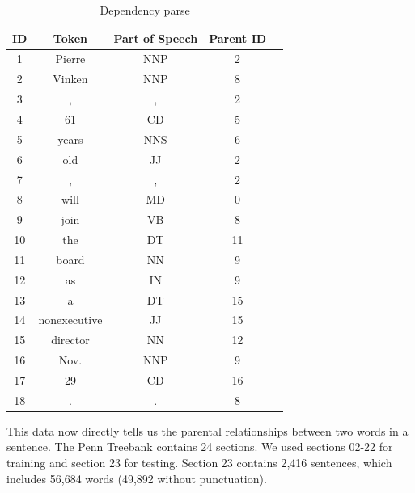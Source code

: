 \documentclass[12pt]{amsart}
\begin{document}
\begin{table}
\label{dependency_parse}
\caption{Dependency parse}
        \begin{tabular}{ccccc}
\hline \hline
            ID & Token & Part of Speech & Parent ID \\ 
            \hline
            1 &Pierre & NNP & 2 \\
            2 & Vinken & NNP & 8\\
            3 & , & , & 2 \\
            4 & 61 & CD & 5 \\
            5 & years & NNS & 6 \\
            6 & old & JJ & 2 \\
            7 & , & , & 2 \\
            8 & will & MD & 0 \\
            9 & join & VB & 8 \\
            10 & the & DT & 11 \\
            11 & board & NN & 9 \\
            12 & as & IN & 9 \\
            13 & a & DT & 15  \\
            14 & nonexecutive & JJ & 15\\
            15 & director & NN & 12 \\
            16 & Nov. & NNP & 9 \\
            17 & 29 & CD & 16 \\
            18 & . & . & 8 \\
            \hline
        \end{tabular}
\end{table}

This data now directly tells us the parental relationships between two words in a sentence. The Penn Treebank contains 24 sections. We used sections 02-22 for training and section 23 for testing. Section 23 contains 2,416 sentences, which includes 56,684 words (49,892 without punctuation).
\end{document}
